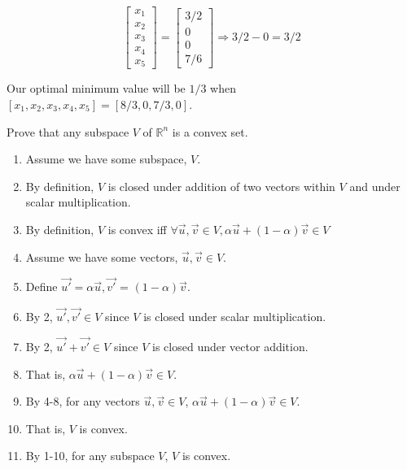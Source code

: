 \documentclass[12pt]{extarticle}
\theoremstyle{definition}
\def\R{{\mathbb{R}}}
\begin{document}
\begin{problem}
	$$\begin{bmatrix} x_1\\x_2\\x_3\\x_4\\x_5 \end{bmatrix} = \begin{bmatrix} 3/2\\0\\0\\7/6\end{bmatrix} \Longrightarrow
		3/2 - 0 = 3/2$$

	Our optimal minimum value will be $1/3$ when $[x_1,x_2,x_3,x_4,x_5] = [8/3, 0, 7/3, 0]$.

\end{problem}

\begin{problem} Prove that any subspace $V$ of $\R^n$ is a convex set.\\

\begin{enumerate}

\item Assume we have some subspace, $V$.
\item By definition, $V$ is closed under addition of two vectors within $V$ and under scalar multiplication.
\item By definition, $V$ is convex iff $\forall \vec{u}, \vec{v} \in V, \alpha\vec{u} + (1-\alpha)\vec{v} \in V$
\item Assume we have some vectors, $\vec{u}, \vec{v} \in V$.
\item Define $\vec{u'} = \alpha\vec{u}, \vec{v'}$ = $(1-\alpha)\vec{v}$.
\item By 2, $\vec{u'}, \vec{v'} \in V$ since $V$ is closed under scalar multiplication.
\item By 2, $\vec{u'} + \vec{v'} \in V$ since $V$ is closed under vector addition.
\item That is, $\alpha\vec{u} + (1-\alpha)\vec{v} \in V$.
\item By 4-8, for any vectors $\vec{u}, \vec{v} \in V$, $\alpha\vec{u} + (1-\alpha)\vec{v} \in V$.
\item That is, $V$ is convex.
\smallskip
\item By 1-10, for any subspace $V$, $V$ is convex.

\end{enumerate}

\end{problem}
\end{document}
